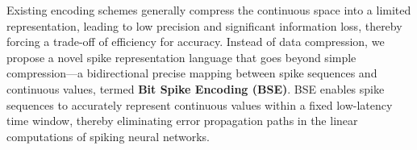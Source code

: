 \documentclass{article}
\theoremstyle{plain}
\theoremstyle{definition}
\theoremstyle{remark}
\begin{document}
Existing encoding schemes generally compress the continuous space into a limited representation, leading to low precision and significant information loss, thereby forcing a trade-off of efficiency for accuracy. Instead of data compression, we propose a novel spike representation language that goes beyond simple compression---a bidirectional precise mapping between spike sequences and continuous values, termed \textbf{Bit Spike Encoding (BSE)}. BSE enables spike sequences to accurately represent continuous values within a fixed low-latency time window, thereby eliminating error propagation paths in the linear computations of spiking neural networks.
\end{document}
